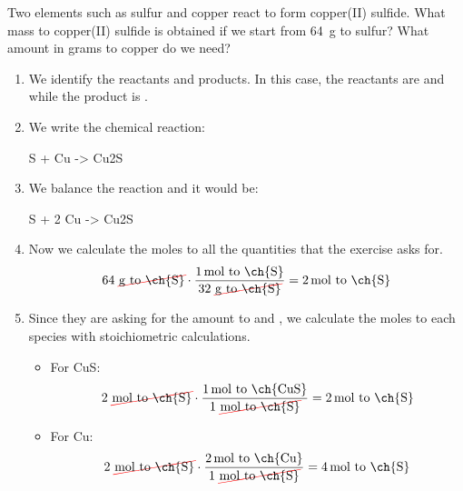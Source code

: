 \begin{example}

    Two elements such as sulfur and copper react to form copper(II) sulfide. What mass to copper(II) sulfide is obtained if we start from \qty{64}{\g} to sulfur?
    What amount in grams to copper do we need?

    \begin{enumerate}[label=\numberballmDarkTeal]
            \item We identify the reactants and products.
            In this case, the reactants are  and  while the product is .
            \item We write the chemical reaction:
            \begin{reaction*}
                S + Cu -> Cu2S
            \end{reaction*}
            \item We balance the reaction and it would be:
            \begin{reaction*}
                S + 2 Cu -> Cu2S
            \end{reaction*}
            \item Now we calculate the moles to all the quantities that the exercise asks for.
            \begin{equation*}
                64\ \cancelred{\unit{\g}\ \text{to \ch{S}}} \cdot \dfrac{\qty{1}{\mole}\ \text{to \ch{S}}}{32\ \cancelred{\unit{\g} \ \text{to \ch{S}}}} = \qty{2}{\mol}\ \text{to \ch{S}}
            \end{equation*}
            \item Since they are asking for the amount to  and , we calculate the moles to each species with stoichiometric calculations.
            \begin{itemize}
                \item For CuS:
                \begin{equation*}
                    2\ \cancelred{\unit{\mol}\ \text{to \ch{S}}} \cdot \dfrac{\qty{1}{\mole}\ \text{to \ch{CuS}}}{1\ \cancelred{\unit{\mole} \ \text{to \ch{S}}}} = \qty{2}{\mol}\ \text{to \ch{S}}
                \end{equation*}
                \item For Cu:
                \begin{equation*}
                    2\ \cancelred{\unit{\mol}\ \text{to \ch{S}}} \cdot \dfrac{\qty{2}{\mole}\ \text{to \ch{Cu}}}{1\ \cancelred{\unit{\mole} \ \text{to \ch{S}}}} = \qty{4}{\mol}\ \text{to \ch{S}}

\end{equation*}
\end{itemize}
\end{enumerate}
\end{example}

